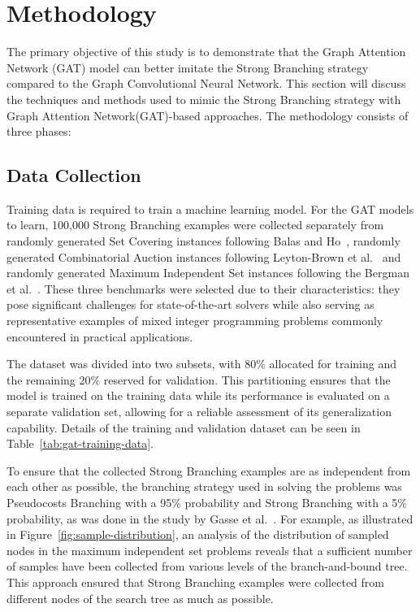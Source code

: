 \section{Methodology}\label{sec:methodology2}\label{sec:methodology}

The primary objective of this study is to demonstrate that the Graph Attention Network (GAT) model can better imitate the Strong Branching strategy compared to the Graph Convolutional Neural Network.
This section will discuss the techniques and methods used to mimic the Strong Branching strategy with Graph Attention Network(GAT)-based approaches.
The methodology consists of three phases:

\subsection{Data Collection}\label{subsec:data-collection}
Training data is required to train a machine learning model.
For the GAT models to learn, 100,000 Strong Branching examples were collected separately from randomly generated Set Covering instances following Balas and Ho~\cite{balasSetCoveringAlgorithms1980}, randomly generated Combinatorial Auction instances following Leyton-Brown et al.~\cite{leyton-brownUniversalTestSuite2000} and randomly generated Maximum Independent Set instances following the Bergman et al.~\cite{bergmanDecisionDiagramsOptimization2016}.
These three benchmarks were selected due to their characteristics: they pose significant challenges for state-of-the-art solvers while also serving as representative examples of mixed integer programming problems commonly encountered in practical applications.


The dataset was divided into two subsets, with 80\% allocated for training and the remaining 20\% reserved for validation.
This partitioning ensures that the model is trained on the training data while its performance is evaluated on a separate validation set, allowing for a reliable assessment of its generalization capability.
Details of the training and validation dataset can be seen in Table~\ref{tab:gat-training-data}.



To ensure that the collected Strong Branching examples are as independent from each other as possible, the branching strategy used in solving the problems was Pseudocosts Branching with a 95\% probability and Strong Branching with a 5\% probability, as was done in the study by Gasse et al.~\cite{gasseExactCombinatorialOptimization2019}.
For example, as illustrated in Figure~\ref{fig:sample-distribution}, an analysis of the distribution of sampled nodes in the maximum independent set problems reveals that a sufficient number of samples have been collected from various levels of the branch-and-bound tree.
This approach ensured that Strong Branching examples were collected from different nodes of the search tree as much as possible.

